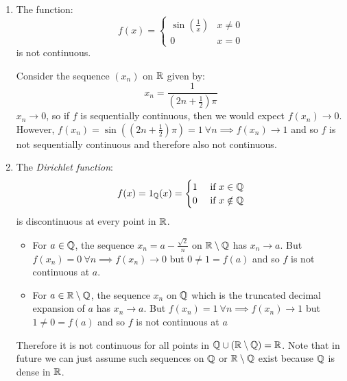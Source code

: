 \documentclass[../main.tex]{subfiles}
\begin{document}
\begin{example}
  \label{dirichletFunction}
  \begin{enumerate}
    \item The function:
      \[
        f(x) = \begin{cases}
          \sin\left(\frac{1}{x}\right) & x \neq 0 \\
          0 & x = 0
        \end{cases}
      \]
      is not continuous.

      \begin{center}
    \end{center}

      Consider the sequence $(x_n)$ on $\mathbb{R}$ given by:
      \[
        x_n = \frac{1}{(2n + \frac{1}{2})\pi}
      \]
      $x_n \to 0$, so if $f$ is sequentially continuous, then we would expect $f(x_n) \to 0$.
      However, $f(x_n) = \sin((2n + \frac{1}{2})\pi) = 1\ \forall n \implies f(x_n) \to 1$ and so $f$ is not sequentially continuous and therefore also not continuous.
    \item The \textit{Dirichlet function}:
      \[
        f(x) = 1_{\mathbb{Q}}(x) = \begin{cases}
        1 & \text{ if } x \in \mathbb{Q} \\
        0 & \text{ if } x \notin \mathbb{Q}
        \end{cases}
      \]
      is discontinuous at every point in $\mathbb{R}$.

      \begin{itemize}
        \item For $a \in \mathbb{Q}$, the sequence $x_n = a - \frac{\sqrt{2}}{n}$ on $\mathbb{R} \setminus \mathbb{Q}$ has $x_n \to a$.
          But $f(x_n) = 0\ \forall n \implies f(x_n) \to 0$ but $0 \neq 1 = f(a)$ and so $f$ is not continuous at $a$.
        \item For $a \in \mathbb{R} \setminus \mathbb{Q}$, the sequence $x_n$ on $\mathbb{Q}$ which is the truncated decimal expansion of $a$ has $x_n \to a$.
          But $f(x_n) = 1\ \forall n \implies f(x_n) \to 1$ but $1 \neq 0 = f(a)$ and so $f$ is not continuous at $a$
      \end{itemize}
      Therefore it is not continuous for all points in $\mathbb{Q} \cup (\mathbb{R} \setminus \mathbb{Q}) = \mathbb{R}$.
      Note that in future we can just assume such sequences on $\mathbb{Q}$ or $\mathbb{R} \setminus \mathbb{Q}$ exist because $\mathbb{Q}$ is dense in $\mathbb{R}$.


\end{enumerate}
\end{example}
\end{document}
